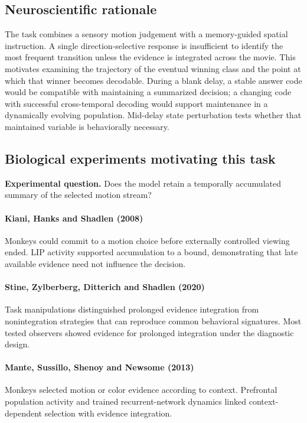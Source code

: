 \documentclass[11pt]{article}
\begin{document}
\subsection{Neuroscientific rationale}
The task combines a sensory motion judgement with a memory-guided spatial instruction. A single direction-selective response is insufficient to identify the most frequent transition unless the evidence is integrated across the movie. This motivates examining the trajectory of the eventual winning class and the point at which that winner becomes decodable. During a blank delay, a stable answer code would be compatible with maintaining a summarized decision; a changing code with successful cross-temporal decoding would support maintenance in a dynamically evolving population. Mid-delay state perturbation tests whether that maintained variable is behaviorally necessary.

\subsection{Biological experiments motivating this task}
\textbf{Experimental question.} Does the model retain a temporally accumulated summary of the selected motion stream?

\paragraph{Kiani, Hanks and Shadlen (2008)} Monkeys could commit to a motion choice before externally controlled viewing ended. LIP activity supported accumulation to a bound, demonstrating that late available evidence need not influence the decision. \cite{bio_kiani}

\paragraph{Stine, Zylberberg, Ditterich and Shadlen (2020)} Task manipulations distinguished prolonged evidence integration from nonintegration strategies that can reproduce common behavioral signatures. Most tested observers showed evidence for prolonged integration under the diagnostic design. \cite{bio_stine}

\paragraph{Mante, Sussillo, Shenoy and Newsome (2013)} Monkeys selected motion or color evidence according to context. Prefrontal population activity and trained recurrent-network dynamics linked context-dependent selection with evidence integration. \cite{bio_mante}
\end{document}
